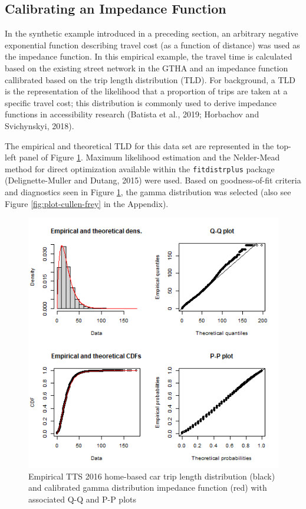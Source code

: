 \documentclass[]{elsarticle} %
\begin{document}
\hypertarget{calibrating-an-impedance-function}{%
\subsection{Calibrating an Impedance
Function}\label{calibrating-an-impedance-function}}

In the synthetic example introduced in a
\protect\hypertarget{accessibility-numerical-example}{}{preceding
section}, an arbitrary negative exponential function describing travel
cost (as a function of distance) was used as the impedance function. In
this empirical example, the travel time is calculated based on the
existing street network in the GTHA and an impedance function
callibrated based on the trip length distribution (TLD). For background,
a TLD is the representation of the likelihood that a proportion of trips
are taken at a specific travel cost; this distribution is commonly used
to derive impedance functions in accessibility research (Batista et al.,
2019; Horbachov and Svichynskyi, 2018).

The empirical and theoretical TLD for this data set are represented in
the top-left panel of Figure \ref{fig:TLD-Gamma-plot}. Maximum
likelihood estimation and the Nelder-Mead method for direct optimization
available within the \texttt{fitdistrplus} package (Delignette-Muller
and Dutang, 2015) were used. Based on goodness-of-fit criteria and
diagnostics seen in Figure \ref{fig:TLD-Gamma-plot}, the gamma
distribution was selected (also see Figure \ref{fig:plot-cullen-frey} in
the Appendix).

\begin{figure}
\includegraphics[width=1\linewidth]{images/impedance_function} \caption{\label{fig:TLD-Gamma-plot}Empirical TTS 2016 home-based car trip length distribution (black) and calibrated gamma distribution impedance function (red) with associated Q-Q and P-P plots}\label{fig:TLD-Gamma-plot}
\end{figure}
\end{document}
